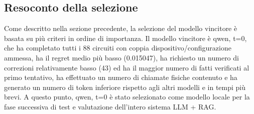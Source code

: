 \subsection{Resoconto della selezione}

Come descritto nella sezione precedente, la selezione del modello vincitore è basata su più criteri in ordine di importanza.
Il modello vincitore è qwen, t=0, che ha completato tutti i 88 circuiti con coppia dispositivo/configurazione ammessa, ha il regret medio più basso (0.015047), ha richiesto un numero di correzioni relativamente basso (43) ed ha il maggior numero di fatti verificati al primo tentativo, ha effettuato un numero di chiamate fisiche contenuto e ha generato un numero di token inferiore rispetto agli altri modelli e in tempi più brevi.
A questo punto, qwen, t=0 è stato selezionato come modello locale per la fase successiva di test e valutazione dell'intero sistema LLM + RAG.